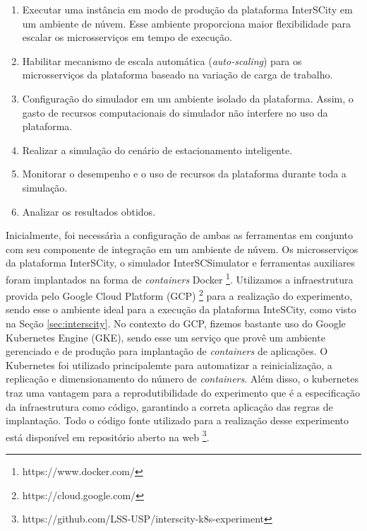 \begin{enumerate}
    \item Executar uma instância em modo de produção da plataforma InterSCity em um ambiente de núvem. Esse ambiente proporciona maior flexibilidade para escalar os microsserviços em tempo
        de execução.

    \item Habilitar mecanismo de escala automática (\textit{auto-scaling}) para os microsserviços da plataforma baseado na variação de carga de trabalho.

    \item Configuração do simulador em um ambiente isolado da plataforma. Assim, o gasto de recursos computacionais do simulador não interfere no uso da plataforma.

    \item Realizar a simulação do cenário de estacionamento inteligente.

    \item Monitorar o desempenho e o uso de recursos da plataforma durante toda a simulação.

    \item Analizar os resultados obtidos.
\end{enumerate}

Inicialmente, foi necessária a configuração de ambas as ferramentas em conjunto com seu componente de integração em um ambiente de núvem.
Os microsserviços da plataforma InterSCity, o simulador InterSCSimulator e ferramentas auxiliares foram implantados na forma de \textit{containers} Docker \footnote{https://www.docker.com/}.
Utilizamos a infraestrutura provida pelo Google Cloud Platform (GCP) \footnote{https://cloud.google.com/} para a realização do experimento, sendo esse o ambiente ideal para a execução da plataforma
InteSCity, como visto na Seção \ref{sec:interscity}.
No contexto do GCP, fizemos bastante uso do Google Kubernetes Engine (GKE), sendo esse um serviço que provê um ambiente gerenciado e de produção para implantação de \textit{containers} de
aplicações.
O Kubernetes foi utilizado principalemte para automatizar a reinicialização, a replicação e dimensionamento do número de \textit{containers}.
Além disso, o kubernetes traz uma vantagem para a reprodutibilidade do experimento que é a especificação da infraestrutura como código, garantindo a correta aplicação das regras de implantação.
Todo o código fonte utilizado para a realização desse experimento está disponível em repositório aberto na web \footnote{https://github.com/LSS-USP/interscity-k8s-experiment}.

